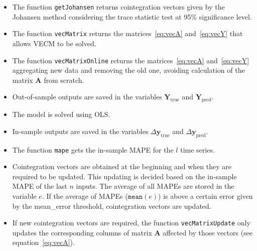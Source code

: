 \begin{itemize}
\item The function \texttt{getJohansen} returns cointegration vectors given by
the Johansen method considering the trace statistic test at 95\%
significance level.
\item The function \texttt{vecMatrix} returns the matrices~\eqref{eq:vecA}
and~\eqref{eq:vecY} that allows VECM to be solved.
\item The function \texttt{vecMatrixOnline} returns the
matrices~\eqref{eq:vecA} and~\eqref{eq:vecY} aggregating new data and removing
the old one, avoiding calculation of the matrix $\mathbf{A}$ from scratch.
\item Out-of-sample outputs are saved in the variables 
$\mathbf{Y}_{\text{true}}$ and $\mathbf{Y}_{\text{pred}}$.
\item The model is solved using OLS.
\item In-sample outputs are saved in the variables $\Delta
\mathbf{y}_{\text{true}}$ and $\Delta \mathbf{y}_{\text{pred}}$.
\item The function \texttt{mape} gets the in-sample MAPE for the $l$ time
series.
\item Cointegration vectors are obtained at the beginning and when they are required to be updated. This updating is decided based on the in-sample MAPE of the last $n$ inputs. The average of all
MAPEs are stored in the variable $e$. If the average of MAPEs
($\texttt{mean}(e)$) is above a certain error given by the mean\_error threshold, cointegration vectors are updated.
\item If new cointegration vectors are required, the function
\texttt{vecMatrixUpdate} only updates the corresponding columns of matrix
$\mathbf{A}$ affected by those vectors (see equation~\eqref{eq:vecA}).
\end{itemize}


